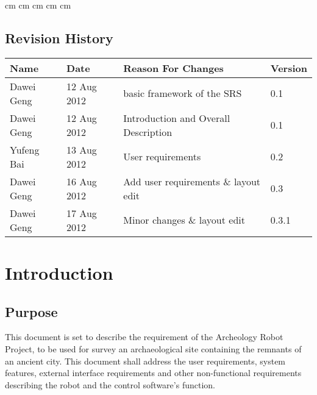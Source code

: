 \documentclass[11pt, a4paper]{report}
\begin{document}
 cm
 cm
 cm
 cm
 cm

\tableofcontents






\clearpage
\section*{Revision History}
\begin{tabular}{| l | l | l | l | }
\hline
Name      		&	Date        	&	Reason For Changes                  	&	Version     	\\ \hline
Dawei Geng      & 	12 Aug 2012    	& 	basic framework of the SRS     			&	0.1             \\ \hline
Dawei Geng      &	12 Aug 2012    	& 	Introduction and Overall Description    &	0.1             \\ \hline
Yufeng Bai  	&	13 Aug 2012 	&	User requirements 						&	0.2  			\\ \hline
Dawei Geng		&	16 Aug 2012		&	Add user requirements \& layout edit	&	0.3 			\\ \hline
Dawei Geng		&	17 Aug 2012		&	Minor changes \& layout edit			&	0.3.1 			\\ \hline





\end{tabular}
\clearpage


\chapter{Introduction}

\section{Purpose}
This document is set to describe the requirement of the Archeology Robot Project, to be used for survey an archaeological site containing the remnants of an ancient city. This document shall address the user requirements, system features, external interface requirements and other non-functional requirements describing the robot and the control software's function. 
\end{document}
